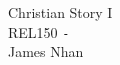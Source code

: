 \documentclass{article}
\begin{document}
\begin{titlepage}
\begin{center}
    {\large Christian Story I} \\
    REL150 \texttt{-} \longdate{\today} \\
    James Nhan
\end{center}
\end{titlepage}

\end{document}
